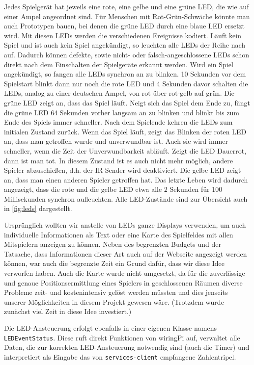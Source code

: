 Jedes Spielgerät hat jeweils eine rote, eine gelbe und eine grüne LED, die wie auf einer Ampel
angeordnet sind.
Für Menschen mit Rot-Grün-Schwäche könnte man auch Prototypen bauen, bei denen die grüne LED durch
eine blaue LED ersetzt wird.
Mit diesen LEDs werden die verschiedenen Ereignisse kodiert.
Läuft kein Spiel und ist auch kein Spiel angekündigt, so leuchten alle LEDs der Reihe nach auf.
Dadurch können defekte, sowie nicht- oder falsch-angeschlossene LEDs schon direkt nach dem
Einschalten der Spielgeräte erkannt werden.
Wird ein Spiel angekündigt, so fangen alle LEDs synchron an zu blinken.
10 Sekunden vor dem Spielstart blinkt dann nur noch die rote LED und 4 Sekunden davor schalten die
LEDs, analog zu einer deutschen Ampel, von rot über rot-gelb auf grün.
Die grüne LED zeigt an, dass das Spiel läuft.
Neigt sich das Spiel dem Ende zu, fängt die grüne LED 64 Sekunden vorher langsam an zu blinken und
blinkt bis zum Ende des Spiels immer schneller.
Nach dem Spielende kehren die LEDs zum initialen Zustand zurück.
Wenn das Spiel läuft, zeigt das Blinken der roten LED an, dass man getroffen wurde und unverwundbar
ist.
Auch sie wird immer schneller, wenn die Zeit der Unverwundbarkeit abläuft.
Zeigt die LED Dauerrot, dann ist man tot.
In diesem Zustand ist es auch nicht mehr möglich, andere Spieler abzuschießen, d.h. der IR-Sender
wird deaktiviert.
Die gelbe LED zeigt an, dass man einen anderen Spieler getroffen hat.
Das letzte Leben wird dadurch angezeigt, dass die rote und die gelbe LED etwa alle 2 Sekunden für
100 Millisekunden synchron aufleuchten.
Alle LED-Zustände sind zur Übersicht auch in \cref{fig:leds} dargestellt.

Ursprünglich wollten wir anstelle von LEDs ganze Displays verwenden, um auch individuelle
Informationen als Text oder eine Karte des Spielfeldes mit allen Mitspielern anzeigen zu können.
Neben des begrenzten Budgets und der Tatsache, dass Informationen dieser Art auch auf der Webseite
angezeigt werden können, war auch die begrenzte Zeit ein Grund dafür, dass wir diese Idee verworfen
haben.
Auch die Karte wurde nicht umgesetzt, da für die zuverlässige und genaue Positionsermittlung eines
Spielers in geschlossenen Räumen diverse Probleme zeit- und kostenintensiv gelöst werden müssten und
dies jenseits unserer Möglichkeiten in diesem Projekt gewesen wäre.
(Trotzdem wurde zunächst viel Zeit in diese Idee investiert.)

Die LED-Ansteuerung erfolgt ebenfalls in einer eigenen Klasse namens \texttt{LEDEventStatus}.
Diese ruft direkt Funktionen von wiringPi auf, verwaltet alle Daten, die zur korrekten
LED-Ansteuerung notwendig sind (auch die Timer) und interpretiert als Eingabe das von
\texttt{services-client} empfangene Zahlentripel.

